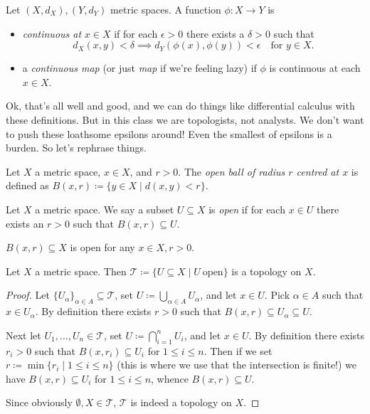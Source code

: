 \begin{definition}
  Let $(X, d_X), (Y, d_Y)$ metric spaces. A function $\phi : X \to Y$
  is
  \begin{itemize}
  \item \textit{continuous at} $x \in X$ if for each $\epsilon > 0$
    there exists a $\delta > 0$ such that
    \[
    d_X(x,y) < \delta \implies d_Y(\phi(x),\phi(y)) < \epsilon
    \quad\text{for } y \in X.
    \]
  \item a \textit{continuous map} (or just \textit{map} if we're
    feeling lazy) if $\phi$ is continuous at each $x \in X$.
  \end{itemize}
\end{definition}

Ok, that's all well and good, and we can do things like differential
calculus with these definitions. But in this class we are topologists,
not analysts. We don't want to push these loathsome epsilons around!
Even the smallest of epsilons is a burden. So let's rephrase things.

\begin{definition}
  Let $X$ a metric space, $x \in X$, and $r > 0$. The \textit{open
    ball of radius $r$ centred at $x$} is defined as $B(x,r) \coloneqq
  \{y \in X \mid d(x,y) < r\}$.
\end{definition}

\begin{definition}
  Let $X$ a metric space. We say a subset $U \subseteq X$ is
  \emph{open} if for each $x \in U$ there exists an $r > 0$ such that
  $B(x,r) \subseteq U$.
\end{definition}

\begin{exercise}
  $B(x,r) \subseteq X$ is open for any $x \in X, r > 0$.
\end{exercise}

\begin{proposition}
  Let $X$ a metric space. Then $\mathcal{T} \coloneqq \{U \subseteq X
  \mid U\ \text{open}\}$ is a topology on $X$.
\end{proposition}

\begin{proof}
  Let $\{U_\alpha\}_{\alpha \in A} \subseteq \mathcal{T}$, set $U
  \coloneqq \bigcup_{\alpha \in A} U_\alpha$, and let $x \in U$. Pick
  $\alpha \in A$ such that $x \in U_\alpha$. By definition there
  exists $r > 0$ such that $B(x,r) \subseteq U_\alpha \subseteq U$.

  Next let $U_1,\ldots,U_n \in \mathcal{T}$, set $U \coloneqq
  \bigcap_{i=1}^n U_i$, and let $x \in U$. By definition there exists
  $r_i > 0$ such that $B(x,r_i) \subseteq U_i$ for $1 \le i \le
  n$. Then if we set $r \coloneqq \min \{r_i \mid 1 \le i \le n\}$
  (this is where we use that the intersection is finite!) we have
  $B(x,r) \subseteq U_i$ for $1 \le i \le n$, whence $B(x,r) \subseteq
  U$.

  Since obviously $\emptyset, X \in \mathcal{T}$, $\mathcal{T}$ is
  indeed a topology on $X$.
\end{proof}


